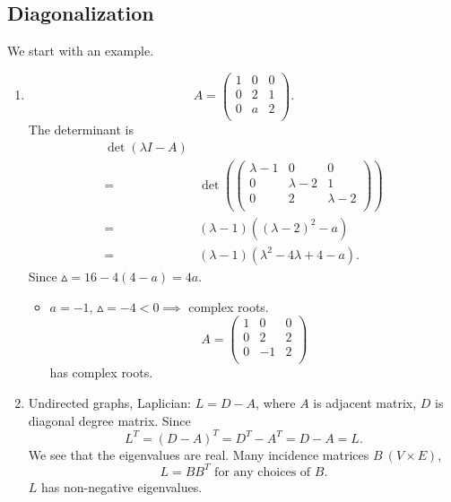 \subsection{Diagonalization}
\begin{eg}
	We start with an example.
	\begin{enumerate}
		\item \[
			      A = \begin{pmatrix}
				      1 & 0 & 0 \\
				      0 & 2 & 1 \\
				      0 & a & 2 \\
			      \end{pmatrix}.
		      \]
		      The determinant is
		      \[
			      \begin{split}
				      \det(\lambda I - A)\\
				      =& \det \left(  \begin{pmatrix}
					      \lambda - 1 & 0            & 0             \\
					      0           & \lambda -  2 & 1             \\
					      0           & 2            & \lambda -   2 \\
				      \end{pmatrix}\right) \\
				      =& (\lambda - 1)((\lambda - 2 )^2 - a)\\
				      =& (\lambda - 1)(\lambda^2 - 4\lambda + 4 - a).
			      \end{split}
		      \]
		      Since \(\vartriangle = 16 - 4(4-a) = 4a\).
		      \begin{itemize}
			      \item \(a = -1\), \(\vartriangle = -4 < 0 \implies\) complex roots.
			            \[
				            A = \begin{pmatrix}
					            1 & 0  & 0 \\
					            0 & 2  & 2 \\
					            0 & -1 & 2 \\
				            \end{pmatrix}
			            \] has complex roots.
		      \end{itemize}
		\item Undirected graphs, Laplician: \(L = D - A\), where \(A\) is adjacent matrix, \(D\) is diagonal degree matrix.
		      Since \[
			      L^{T} = (D - A)^{T} = D^{T} - A^{T} = D - A = L.
		      \] We see that the eigenvalues are real. Many incidence matrices \(B\ (V\times  E)\),
		      \[
			      L = BB^{T} \text{ for any choices of }B.
		      \]
		      \(L\) has non-negative eigenvalues.
	\end{enumerate}
\end{eg}

